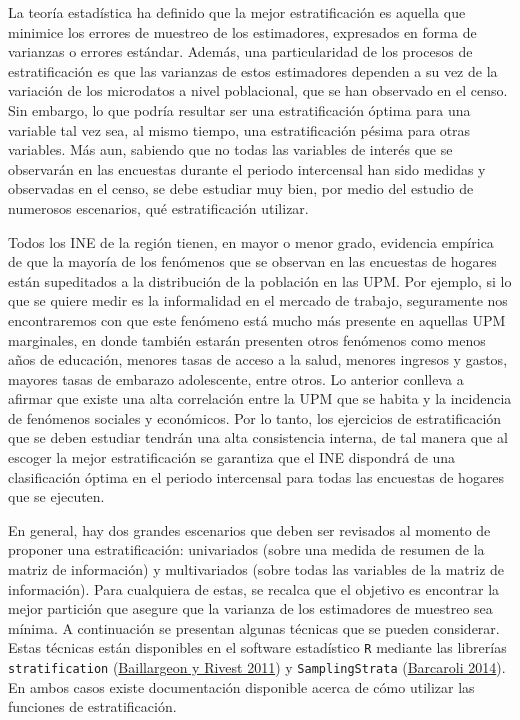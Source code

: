 \documentclass[
  12pt,
  spanish,
]{book}
\begin{document}
La teoría estadística ha definido que la mejor estratificación es aquella que minimice los errores de muestreo de los estimadores, expresados en forma de varianzas o errores estándar. Además, una particularidad de los procesos de estratificación es que las varianzas de estos estimadores dependen a su vez de la variación de los microdatos a nivel poblacional, que se han observado en el censo. Sin embargo, lo que podría resultar ser una estratificación óptima para una variable tal vez sea, al mismo tiempo, una estratificación pésima para otras variables. Más aun, sabiendo que no todas las variables de interés que se observarán en las encuestas durante el periodo intercensal han sido medidas y observadas en el censo, se debe estudiar muy bien, por medio del estudio de numerosos escenarios, qué estratificación utilizar.

Todos los INE de la región tienen, en mayor o menor grado, evidencia empírica de que la mayoría de los fenómenos que se observan en las encuestas de hogares están supeditados a la distribución de la población en las UPM. Por ejemplo, si lo que se quiere medir es la informalidad en el mercado de trabajo, seguramente nos encontraremos con que este fenómeno está mucho más presente en aquellas UPM marginales, en donde también estarán presenten otros fenómenos como menos años de educación, menores tasas de acceso a la salud, menores ingresos y gastos, mayores tasas de embarazo adolescente, entre otros. Lo anterior conlleva a afirmar que existe una alta correlación entre la UPM que se habita y la incidencia de fenómenos sociales y económicos. Por lo tanto, los ejercicios de estratificación que se deben estudiar tendrán una alta consistencia interna, de tal manera que al escoger la mejor estratificación se garantiza que el INE dispondrá de una clasificación óptima en el periodo intercensal para todas las encuestas de hogares que se ejecuten.

En general, hay dos grandes escenarios que deben ser revisados al momento de proponer una estratificación: univariados (sobre una medida de resumen de la matriz de información) y multivariados (sobre todas las variables de la matriz de información). Para cualquiera de estas, se recalca que el objetivo es encontrar la mejor partición que asegure que la varianza de los estimadores de muestreo sea mínima. A continuación se presentan algunas técnicas que se pueden considerar. Estas técnicas están disponibles en el software estadístico \texttt{R} mediante las librerías \texttt{stratification} (\protect\hyperlink{ref-Baillargeon_Rivest_2011}{Baillargeon y Rivest 2011}) y \texttt{SamplingStrata} (\protect\hyperlink{ref-Barcaroli_2014}{Barcaroli 2014}). En ambos casos existe documentación disponible acerca de cómo utilizar las funciones de estratificación.
\end{document}
